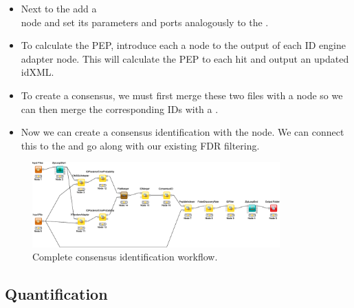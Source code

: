 \begin{itemize}
\item
Next to the  add a  \\
 node and set its parameters and ports analogously to the .
\item
To calculate the PEP, introduce each a   node to the output of each ID engine adapter node.
This will calculate the PEP to each hit and output an updated idXML.
\item
To create a consensus, we must first merge these two files with a  node  so we can then merge the corresponding IDs with a  .
\item
Now we can create a consensus identification with the   node.
We can connect this to the  and go along with our existing FDR filtering.
\end{itemize}

\begin{figure}[htbp]
  \centering
  \includegraphics[width=0.85\textwidth]{graphics/labelfree/consensus_id}
  \caption{Complete consensus identification workflow.}
  \label{fig:consensusid}
\end{figure}


\subsection{Quantification}
\label{Labelfree_Quantification}

